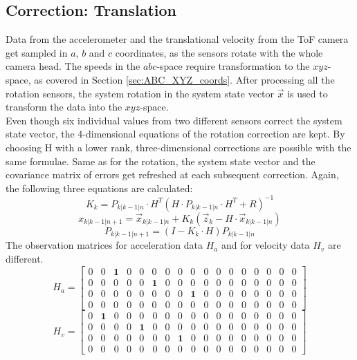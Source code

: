 \subsection{Correction: Translation}
Data from the accelerometer and the translational velocity from the ToF camera get sampled in $a$, $b$ and $c$ coordinates, as the sensors rotate with the whole camera head. The speeds in the $abc$-space require transformation to the $xyz$-space, as covered in Section \ref{sec:ABC_XYZ_coords}. After processing all the rotation sensors, the system rotation in the system state vector $\vec{x}$ is used to transform the data into the $xyz$-space.\\
Even though six individual values from two different sensors correct the system state vector, the 4-dimensional equations of the rotation correction are kept. By choosing H with a lower rank, three-dimensional corrections are possible with the same formulae. Same as for the rotation, the system state vector and the covariance matrix of errors get refreshed at each subsequent correction.
Again, the following three equations are calculated:
\begin{equation*}
    K_{k} = P_{k|k-1|n}\cdot H^{T}(H\cdot P_{k|k-1|n}\cdot H^{T}+R)^{-1}
\end{equation*}
\begin{equation*}
    x_{k|k-1|n+1} = \vec{x}_{k|k-1|n}+K_{k}(\vec{z}_{k}-H\cdot \vec{x}_{k|k-1|n})
\end{equation*}
\begin{equation*}
    P_{k|k-1|n+1}= (I-K_{k}\cdot H)P_{k|k-1|n}
\end{equation*}
The observation matrices for acceleration data $H_{a}$ and for velocity data $H_{v}$ are different.
\begin{equation*}
    H_{a}=
    \begin{bmatrix}
        0 & 0 & \textbf{1} & 0 & 0 & 0 & 0 & 0 & 0 & 0 & 0 & 0 & 0 & 0 & 0 & 0 & 0 \\
        0 & 0 & 0 & 0 & 0 & \textbf{1} & 0 & 0 & 0 & 0 & 0 & 0 & 0 & 0 & 0 & 0 & 0 \\
        0 & 0 & 0 & 0 & 0 & 0 & 0 & 0 & \textbf{1} & 0 & 0 & 0 & 0 & 0 & 0 & 0 & 0 \\
        0 & 0 & 0 & 0 & 0 & 0 & 0 & 0 & 0 & 0 & 0 & 0 & 0 & 0 & 0 & 0 & 0
    \end{bmatrix}
\end{equation*}
\begin{equation*}
    H_{v}=
    \begin{bmatrix}
        0 & \textbf{1} & 0 & 0 & 0 & 0 & 0 & 0 & 0 & 0 & 0 & 0 & 0 & 0 & 0 & 0 & 0 \\
        0 & 0 & 0 & 0 & \textbf{1} & 0 & 0 & 0 & 0 & 0 & 0 & 0 & 0 & 0 & 0 & 0 & 0 \\
        0 & 0 & 0 & 0 & 0 & 0 & 0 & \textbf{1} & 0 & 0 & 0 & 0 & 0 & 0 & 0 & 0 & 0 \\
        0 & 0 & 0 & 0 & 0 & 0 & 0 & 0 & 0 & 0 & 0 & 0 & 0 & 0 & 0 & 0 & 0
    \end{bmatrix}
\end{equation*}
